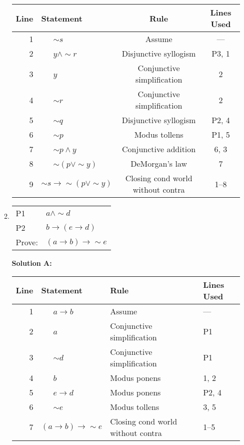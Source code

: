 \documentclass[12pt, letterpaper]{report}
\newcommand{\nott}{{\sim}}
\begin{document}
\begin{enumerate}
\begin{enumerate}
                \begin{tabular}{|r|l|c|c|} \hline
                Line & Statement & Rule & Lines Used \\ \hline
                1 & \ \ \vline \ $\nott s$ & Assume & ---\\ \hline
                2 & \ \ \vline \ $y \land \nott r$ & Disjunctive syllogism & P3, 1\\ \hline
                3 & \ \ \vline \ $y $ & Conjunctive simplification & 2\\ \hline
                4 & \ \ \vline \ $\nott r$ & Conjunctive simplification & 2\\ \hline
                5 & \ \ \vline \ $\nott q$ & Disjunctive syllogism & P2, 4\\ \hline
                6 & \ \ \vline \ $\nott p$ & Modus tollens & P1, 5\\ \hline
                7 & \ \ \vline \ $\nott p \land y$ & Conjunctive addition & 6, 3\\ \hline
                8 & \ \ \vline \ $\nott (p \lor \nott y)$ & DeMorgan's law & 7\\ \hline
                9 & $\nott s \to \nott (p \lor \nott y)$ & Closing cond world without contra & 1--8\\ \hline
                \end{tabular}
                
                
                \item
                        \begin{tabular}[t]{ll}
                        P1 & $a \land \nott d$ \\
                        P2 & $b \to (e \to d)$ \\ \hline
                        Prove: & $(a \to b) \to \nott e$
                \end{tabular}

 \textbf{Solution A:}

\begin{tabular}{|r|l|l|l|} \hline
Line & Statement & Rule & Lines Used \\ \hline
1 & \ \ \vline \ $a \to b$ & Assume & ---\\ \hline
2 & \ \ \vline \ $a$ & Conjunctive simplification & P1\\ \hline
3 & \ \ \vline \ $\nott d$ & Conjunctive simplification & P1\\ \hline
4 & \ \ \vline \ $b$ & Modus ponens & 1, 2\\ \hline
5 & \ \ \vline \ $e \to d$ & Modus ponens & P2, 4\\ \hline
6 & \ \ \vline \ $\nott e$ & Modus tollens & 3, 5\\ \hline
7 & $(a \to b) \to \nott e$ & Closing cond world without contra & 1--5 \\ \hline
\end{tabular}


\end{enumerate}
\end{enumerate}
\end{document}
